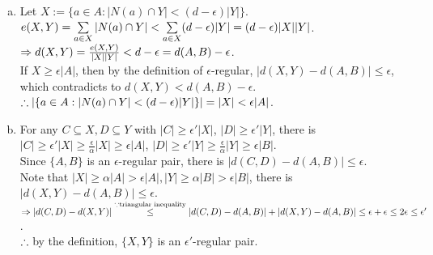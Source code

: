 \setcounter{pr}{0}

\begin{pr}$ $
\begin{enumerate}[(a)]
\item Let $X:=\{a\in A:|N(a)\cap Y|<(d-\epsilon)|Y|\}$.\\
$e(X, Y)=\sum\limits_{a\in X}|N(a)\cap Y|<\sum\limits_{a\in X}(d-\epsilon)|Y|=(d-\epsilon)|X||Y|$.\\
$\Rightarrow d(X, Y)=\frac{e(X, Y)}{|X||Y|}<d-\epsilon=d(A, B)-\epsilon$.\\
If $X\geq\epsilon|A|$, then by the definition of $\epsilon$-regular, $|d(X, Y)-d(A, B)|\leq\epsilon$, which contradicts to $d(X, Y)<d(A, B)-\epsilon$.\\
$\therefore\left|\{a\in A:|N(a)\cap Y|<(d-\epsilon)|Y|\}\right|=|X|<\epsilon|A|$.
\item For any $C\subseteq X, D\subseteq Y$ with $|C|\geq\epsilon'|X|$, $|D|\geq\epsilon'|Y|$, there is $|C|\geq\epsilon'|X|\geq\frac\epsilon\alpha|X|\geq\epsilon|A|$, $|D|\geq\epsilon'|Y|\geq\frac\epsilon\alpha|Y|\geq\epsilon|B|$.\\
Since $\{A, B\}$ is an $\epsilon$-regular pair, there is $|d(C, D)-d(A, B)|\leq\epsilon$.\\
Note that $|X|\geq\alpha|A|>\epsilon|A|, |Y|\geq\alpha|B|>\epsilon|B|$, there is $|d(X, Y)-d(A, B)|\leq\epsilon$.\\
$\Rightarrow|d(C, D)-d(X, Y)|\overset{\because\text{triangular inequality}}\leq|d(C, D)-d(A, B)|+|d(X, Y)-d(A, B)|\leq\epsilon+\epsilon\leq2\epsilon\leq\epsilon'$.\\
$\therefore$ by the definition, $\{X, Y\}$ is an $\epsilon'$-regular pair.
\end{enumerate}
\end{pr}
